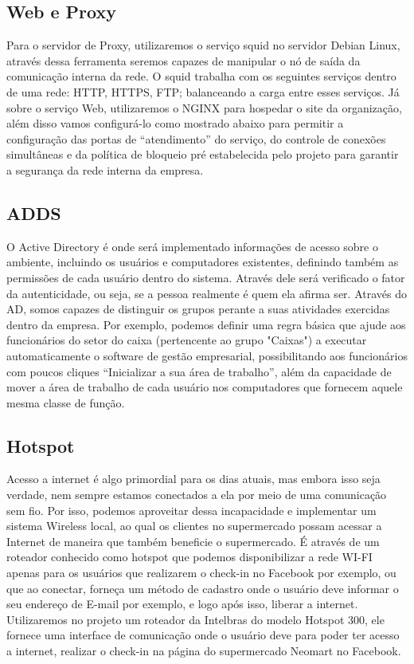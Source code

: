 \documentclass[12pt]{article}
\begin{document}
\subsection{Web e Proxy}
Para o servidor de Proxy, utilizaremos o serviço squid no servidor Debian Linux, através dessa ferramenta seremos capazes de manipular o nó de saída da comunicação interna da rede. O squid trabalha com os seguintes serviços dentro de uma rede: HTTP, HTTPS, FTP; balanceando a carga entre esses serviços. Já sobre o serviço Web, utilizaremos o NGINX para hospedar o site da organização, além disso vamos configurá-lo como mostrado abaixo para permitir a configuração das portas de “atendimento” do serviço, do controle de conexões simultâneas e da política de bloqueio pré estabelecida pelo projeto para garantir a segurança da rede interna da empresa.

\subsection{ADDS}
O Active Directory é onde será implementado informações de acesso sobre o ambiente, incluindo os usuários e computadores existentes, definindo também as permissões de cada usuário dentro do sistema. Através dele será verificado o fator da autenticidade, ou seja, se a pessoa realmente é quem ela afirma ser.
Através do AD, somos capazes de distinguir os grupos perante a suas atividades exercidas dentro da empresa. Por exemplo, podemos definir uma regra básica que ajude aos funcionários do setor do caixa (pertencente ao grupo "Caixas") a executar automaticamente o software de gestão empresarial, possibilitando aos funcionários com poucos cliques “Inicializar a sua área de trabalho”, além da capacidade de mover a área de trabalho de cada usuário nos computadores que fornecem aquele mesma classe de função.

\subsection{Hotspot}
Acesso a internet é algo primordial para os dias atuais, mas embora isso seja verdade, nem sempre estamos conectados a ela por meio de uma comunicação sem fio. Por isso, podemos aproveitar dessa incapacidade e implementar um sistema Wireless local, ao qual os clientes no supermercado possam acessar a Internet de maneira que também beneficie o supermercado. É através de um roteador conhecido como hotspot que podemos disponibilizar a rede WI-FI apenas para os usuários que realizarem o check-in no Facebook por exemplo, ou que ao conectar, forneça um método de cadastro onde o usuário deve informar o seu endereço de E-mail por exemplo, e logo após isso, liberar a internet.\newline
Utilizaremos no projeto um roteador da Intelbras do modelo Hotspot 300, ele fornece uma interface de comunicação onde o usuário deve para poder ter acesso a internet, realizar o check-in na página do supermercado Neomart no Facebook.
\end{document}
